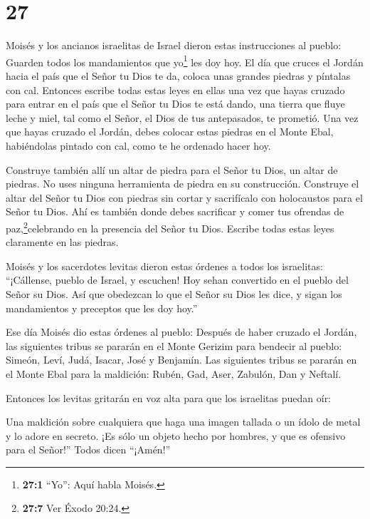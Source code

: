 \hypertarget{section-26}{%
\section{27}\label{section-26}}

 Moisés y los ancianos israelitas de Israel dieron estas
instrucciones al pueblo: Guarden todos los mandamientos que
yo\footnote{\textbf{27:1} ``Yo'': Aquí habla Moisés.} les doy hoy.
 El día que cruces el Jordán hacia el país que el Señor tu
Dios te da, coloca unas grandes piedras y píntalas con cal. 
Entonces escribe todas estas leyes en ellas una vez que hayas cruzado
para entrar en el país que el Señor tu Dios te está dando, una tierra
que fluye leche y miel, tal como el Señor, el Dios de tus antepasados,
te prometió.  Una vez que hayas cruzado el Jordán, debes
colocar estas piedras en el Monte Ebal, habiéndolas pintado con cal,
como te he ordenado hacer hoy.

 Construye también allí un altar de piedra para el Señor tu
Dios, un altar de piedras. No uses ninguna herramienta de piedra en su
construcción.  Construye el altar del Señor tu Dios con
piedras sin cortar y sacrifícalo con holocaustos para el Señor tu Dios.
 Ahí es también donde debes sacrificar y comer tus ofrendas
de paz,\footnote{\textbf{27:7} Ver Éxodo 20:24.}celebrando en la
presencia del Señor tu Dios.  Escribe todas estas leyes
claramente en las piedras.

 Moisés y los sacerdotes levitas dieron estas órdenes a
todos los israelitas: ``¡Cállense, pueblo de Israel, y escuchen! Hoy
sehan convertido en el pueblo del Señor su Dios.  Así que
obedezcan lo que el Señor su Dios les dice, y sigan los mandamientos y
preceptos que les doy hoy.''

 Ese día Moisés dio estas órdenes al pueblo: 
Después de haber cruzado el Jordán, las siguientes tribus se pararán en
el Monte Gerizim para bendecir al pueblo: Simeón, Leví, Judá, Isacar,
José y Benjamín.  Las siguientes tribus se pararán en el
Monte Ebal para la maldición: Rubén, Gad, Aser, Zabulón, Dan y Neftalí.

 Entonces los levitas gritarán en voz alta para que los
israelitas puedan oír:

 Una maldición sobre cualquiera que haga una imagen tallada
o un ídolo de metal y lo adore en secreto. ¡Es sólo un objeto hecho por
hombres, y que es ofensivo para el Señor!'' Todos dicen ``¡Amén!''

